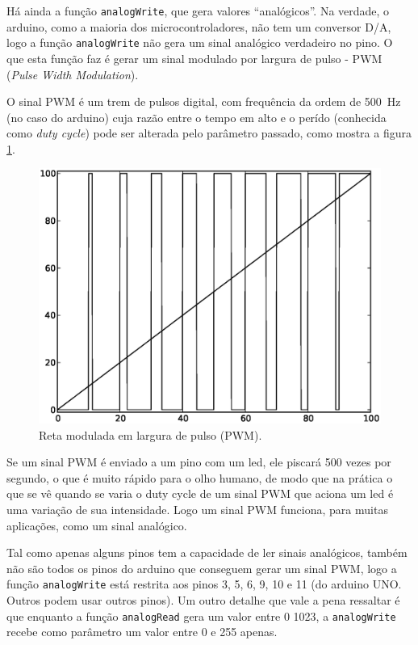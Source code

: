 Há ainda a função \lstinline|analogWrite|, que gera valores ``analógicos''. Na verdade, o arduino, como a maioria dos microcontroladores, não tem um conversor D/A, logo a função \lstinline|analogWrite| não gera um sinal analógico verdadeiro no pino. O que esta função faz é gerar um sinal modulado por largura de pulso - PWM (\emph{Pulse Width Modulation}).

O sinal PWM é um trem de pulsos digital, com frequência da ordem de \SI{500}{Hz} (no caso do arduino) cuja razão entre o tempo em alto e o perído (conhecida como \emph{duty cycle}) pode ser alterada pelo parâmetro passado, como mostra a figura \ref{fig:pwm}.
\begin{figure}[hbt]
	\centering
	\includegraphics[width=\textwidth]{figuras/pwm}
	\caption{Reta modulada em largura de pulso (PWM).}
	\label{fig:pwm}
\end{figure}	
 Se um sinal PWM é enviado a um pino com um led, ele piscará 500 vezes por segundo, o que é muito rápido para o olho humano, de modo que na prática o que se vê quando se varia o duty cycle de um sinal PWM que aciona um led é uma variação de sua intensidade. Logo um sinal PWM funciona, para muitas aplicações, como um sinal analógico.

Tal como apenas alguns pinos tem a capacidade de ler sinais analógicos, também não são todos os pinos do arduino que conseguem gerar um sinal PWM, logo a função \lstinline|analogWrite| está restrita aos pinos 3, 5, 6, 9, 10 e 11 (do arduino UNO. Outros podem usar outros pinos). Um outro detalhe que vale a pena ressaltar é que enquanto a função \lstinline|analogRead| gera um valor entre 0  1023, a \lstinline|analogWrite| recebe como parâmetro um valor entre 0 e 255 apenas.

